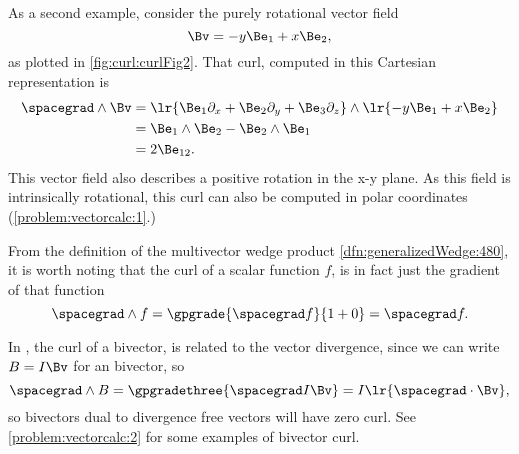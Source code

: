 As a second example, consider the purely rotational vector field
\begin{equation}\label{eqn:vectorcalc:1090}
\Bv = -y \Be_1 + x \Be_2,
\end{equation}
as plotted in \cref{fig:curl:curlFig2}.
That curl, computed in this Cartesian representation is
\begin{equation}\label{eqn:vectorcalc:1110}
\begin{aligned}
\spacegrad \wedge \Bv
&=
\lr{ \Be_1 \partial_x + \Be_2 \partial_y + \Be_3 \partial_z } \wedge \lr{ -y \Be_1 + x \Be_2 } \\
&=
\Be_1 \wedge \Be_2 - \Be_2 \wedge \Be_1 \\
&=
2 \Be_{12}.
\end{aligned}
\end{equation}
This vector field also describes a positive rotation in the x-y plane.
As this field is intrinsically rotational, this curl can also be computed in polar coordinates (\cref{problem:vectorcalc:1}.)

From the definition of the multivector wedge product \cref{dfn:generalizedWedge:480}, it is worth noting that
the curl of a scalar function \( f \), is in fact just the gradient of that function
\begin{equation}\label{eqn:vectorcalc:200}
\spacegrad \wedge f = \gpgrade{\spacegrad f}{1+0} = \spacegrad f.
\end{equation}

In , the curl of a bivector, is related to the vector divergence, since we can write \( B = I \Bv \) for an  bivector, so
\begin{equation}\label{eqn:vectorcalc:1170}
\spacegrad \wedge B = \gpgradethree{ \spacegrad I \Bv } = I \lr{ \spacegrad \cdot \Bv },
\end{equation}
so  bivectors dual to divergence free vectors will have zero curl.
See \cref{problem:vectorcalc:2} for some examples of bivector curl.

